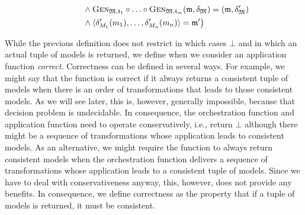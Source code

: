 \begin{definition}
\begin{align*}
            & \formulaskip \formulaskip \formulaskip
            \land \generalizationfunction{\metamodeltuple{M},\transformation{t}_{1}} \concatfunction \dots \concatfunction \generalizationfunction{\metamodeltuple{M},\transformation{t}_{m}}(\modeltuple{m}, \changetuple{\metamodeltuple{M}}) = (\modeltuple{m}, \changetuple{\metamodeltuple{M}}')\\
            & \formulaskip \formulaskip \formulaskip
            \land \tupled{\change{\metamodel{M}{1}}'(\model{m}{1}), \dots, \change{\metamodel{M}{n}}'(\model{m}{n})} = \modeltuple{m'}
        \big)
    \end{align*}
\end{definition}

While the previous definition does not restrict in which cases $\bot$ and in which an actual tuple of models is returned, we define when we consider an \gls{application function} \emph{correct}.
Correctness can be defined in several ways.
For example, we might say that the function is correct if it always returns a consistent tuple of models when there is an order of transformations that leads to those consistent models.
As we will see later, this is, however, generally impossible, because that decision problem is undecidable.
In consequence, the \gls{orchestration function} and \gls{application function} need to operate conservatively, i.e., return $\bot$ although there might be a sequence of transformations whose application leads to consistent models.
As an alternative, we might require the function to always return consistent models when the \gls{orchestration function} delivers a sequence of transformations whose application leads to a consistent tuple of models.
Since we have to deal with conservativeness anyway, this, however, does not provide any benefits.
In consequence, we define correctness as the property that if a tuple of models is returned, it must be consistent.

